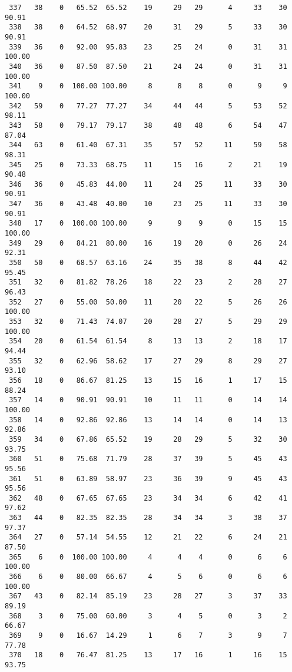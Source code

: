 \begin{verbatim}
 337   38    0   65.52  65.52    19     29   29      4     33    30    90.91
 338   38    0   64.52  68.97    20     31   29      5     33    30    90.91
 339   36    0   92.00  95.83    23     25   24      0     31    31   100.00
 340   36    0   87.50  87.50    21     24   24      0     31    31   100.00
 341    9    0  100.00 100.00     8      8    8      0      9     9   100.00
 342   59    0   77.27  77.27    34     44   44      5     53    52    98.11
 343   58    0   79.17  79.17    38     48   48      6     54    47    87.04
 344   63    0   61.40  67.31    35     57   52     11     59    58    98.31
 345   25    0   73.33  68.75    11     15   16      2     21    19    90.48
 346   36    0   45.83  44.00    11     24   25     11     33    30    90.91
 347   36    0   43.48  40.00    10     23   25     11     33    30    90.91
 348   17    0  100.00 100.00     9      9    9      0     15    15   100.00
 349   29    0   84.21  80.00    16     19   20      0     26    24    92.31
 350   50    0   68.57  63.16    24     35   38      8     44    42    95.45
 351   32    0   81.82  78.26    18     22   23      2     28    27    96.43
 352   27    0   55.00  50.00    11     20   22      5     26    26   100.00
 353   32    0   71.43  74.07    20     28   27      5     29    29   100.00
 354   20    0   61.54  61.54     8     13   13      2     18    17    94.44
 355   32    0   62.96  58.62    17     27   29      8     29    27    93.10
 356   18    0   86.67  81.25    13     15   16      1     17    15    88.24
 357   14    0   90.91  90.91    10     11   11      0     14    14   100.00
 358   14    0   92.86  92.86    13     14   14      0     14    13    92.86
 359   34    0   67.86  65.52    19     28   29      5     32    30    93.75
 360   51    0   75.68  71.79    28     37   39      5     45    43    95.56
 361   51    0   63.89  58.97    23     36   39      9     45    43    95.56
 362   48    0   67.65  67.65    23     34   34      6     42    41    97.62
 363   44    0   82.35  82.35    28     34   34      3     38    37    97.37
 364   27    0   57.14  54.55    12     21   22      6     24    21    87.50
 365    6    0  100.00 100.00     4      4    4      0      6     6   100.00
 366    6    0   80.00  66.67     4      5    6      0      6     6   100.00
 367   43    0   82.14  85.19    23     28   27      3     37    33    89.19
 368    3    0   75.00  60.00     3      4    5      0      3     2    66.67
 369    9    0   16.67  14.29     1      6    7      3      9     7    77.78
 370   18    0   76.47  81.25    13     17   16      1     16    15    93.75

\end{verbatim}

